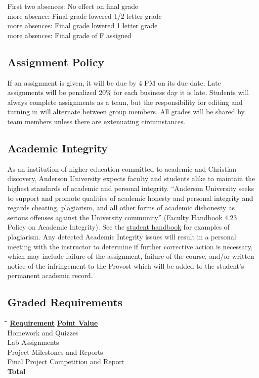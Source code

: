 \documentclass[12pt,letterpaper,onecolumn]{report}
\begin{document}
\noindent First two absences: No effect on final grade\\
 more absence: Final grade lowered 1/2 letter grade\\
 more absences: Final grade lowered 1 letter grade\\
 more absences: Final grade of F assigned

\subsection*{Assignment Policy}
If an assignment is given, it will be due by 4 PM on its due date.  Late assignments will be penalized 20\% for each business day it is late.  Students will always complete assignments as a team, but the responsibility for editing and turning in will alternate between group members.  All grades will be shared by team members unless there are extenuating circumstances.

\subsection*{Academic Integrity}
As an institution of higher education committed to academic and Christian discovery, Anderson University expects faculty and students alike to maintain the highest standards of academic and personal integrity. “Anderson University seeks to support and promote qualities of academic honesty and personal integrity and regards cheating, plagiarism, and all other forms of academic dishonesty as serious offenses against the University community” (Faculty Handbook 4.23 Policy on Academic Integrity). See the \href{https://www.anderson.edu/students/policies/handbook}{student handbook} for examples of plagiarism.  Any detected Academic Integrity issues will result in a personal meeting with the instructor to determine if further corrective action is necessary, which may include failure of the assignment, failure of the course, and/or written notice of the infringement to the Provost which will be added to the student's permanent academic record.

\subsection*{Graded Requirements}

\begin{tabbing}
\hspace{3in}\=\hspace{3in}\=\kill
\textbf{\underline{Requirement}} \> \textbf{\underline{Point Value}} \\  
Homework and Quizzes \\ 
Lab Assignments\\
Project Milestones and Reports  \\ 
Final Project Competition and Report \\ 
\textbf{Total} 

\end{tabbing}
\end{document}
